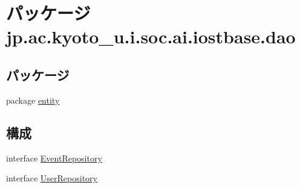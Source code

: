 \hypertarget{namespacejp_1_1ac_1_1kyoto__u_1_1i_1_1soc_1_1ai_1_1iostbase_1_1dao}{\section{パッケージ jp.\-ac.\-kyoto\-\_\-u.\-i.\-soc.\-ai.\-iostbase.\-dao}
\label{namespacejp_1_1ac_1_1kyoto__u_1_1i_1_1soc_1_1ai_1_1iostbase_1_1dao}
}
\subsection*{パッケージ}
\begin{DoxyCompactItemize}
\item 
package \hyperlink{namespacejp_1_1ac_1_1kyoto__u_1_1i_1_1soc_1_1ai_1_1iostbase_1_1dao_1_1entity}{entity}
\end{DoxyCompactItemize}
\subsection*{構成}
\begin{DoxyCompactItemize}
\item 
interface \hyperlink{interfacejp_1_1ac_1_1kyoto__u_1_1i_1_1soc_1_1ai_1_1iostbase_1_1dao_1_1_event_repository}{Event\-Repository}
\item 
interface \hyperlink{interfacejp_1_1ac_1_1kyoto__u_1_1i_1_1soc_1_1ai_1_1iostbase_1_1dao_1_1_user_repository}{User\-Repository}
\end{DoxyCompactItemize}
